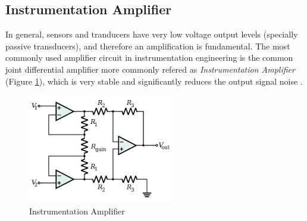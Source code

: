 \subsection{Instrumentation Amplifier}

	In general, sensors and tranducers have very low voltage output levels (specially passive transducers), and therefore an amplification is fundamental. The most commonly used amplifier circuit in instrumentation engineering is the common joint differential amplifier more commonly refered as \textit{Instrumentation Amplifier} (Figure \ref{fig-instrumentation-amplifier}), which is very stable and significantly reduces the output signal noise \cite{wait1975introduction}.

		\begin{figure}[htbp]
			\centering
				\includegraphics[scale=1.1]{figuras/fig-instrumentation-amp.png}
			\caption{Instrumentation Amplifier \cite{3opamp}}
			\label{fig-instrumentation-amplifier}
		\end{figure}


